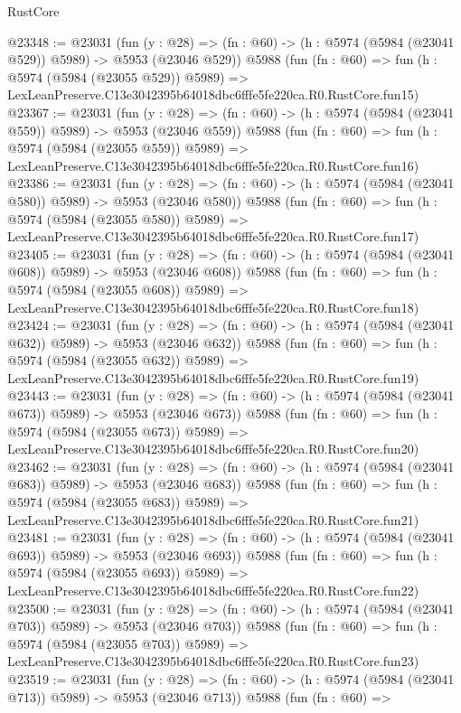 \begin{lexlean}{RustCore}
\begin{coremodule}
@23348 := @23031
    (fun (y : @28) => (fn : @60) -> (h : @5974 (@5984 (@23041 @529)) @5989) -> @5953 (@23046 @529))
    @5988
    (fun (fn : @60) =>
    fun (h : @5974 (@5984 (@23055 @529)) @5989) =>
    LexLeanPreserve.C13e3042395b64018dbc6fffe5fe220ca.R0.RustCore.fun15)
@23367 := @23031
    (fun (y : @28) => (fn : @60) -> (h : @5974 (@5984 (@23041 @559)) @5989) -> @5953 (@23046 @559))
    @5988
    (fun (fn : @60) =>
    fun (h : @5974 (@5984 (@23055 @559)) @5989) =>
    LexLeanPreserve.C13e3042395b64018dbc6fffe5fe220ca.R0.RustCore.fun16)
@23386 := @23031
    (fun (y : @28) => (fn : @60) -> (h : @5974 (@5984 (@23041 @580)) @5989) -> @5953 (@23046 @580))
    @5988
    (fun (fn : @60) =>
    fun (h : @5974 (@5984 (@23055 @580)) @5989) =>
    LexLeanPreserve.C13e3042395b64018dbc6fffe5fe220ca.R0.RustCore.fun17)
@23405 := @23031
    (fun (y : @28) => (fn : @60) -> (h : @5974 (@5984 (@23041 @608)) @5989) -> @5953 (@23046 @608))
    @5988
    (fun (fn : @60) =>
    fun (h : @5974 (@5984 (@23055 @608)) @5989) =>
    LexLeanPreserve.C13e3042395b64018dbc6fffe5fe220ca.R0.RustCore.fun18)
@23424 := @23031
    (fun (y : @28) => (fn : @60) -> (h : @5974 (@5984 (@23041 @632)) @5989) -> @5953 (@23046 @632))
    @5988
    (fun (fn : @60) =>
    fun (h : @5974 (@5984 (@23055 @632)) @5989) =>
    LexLeanPreserve.C13e3042395b64018dbc6fffe5fe220ca.R0.RustCore.fun19)
@23443 := @23031
    (fun (y : @28) => (fn : @60) -> (h : @5974 (@5984 (@23041 @673)) @5989) -> @5953 (@23046 @673))
    @5988
    (fun (fn : @60) =>
    fun (h : @5974 (@5984 (@23055 @673)) @5989) =>
    LexLeanPreserve.C13e3042395b64018dbc6fffe5fe220ca.R0.RustCore.fun20)
@23462 := @23031
    (fun (y : @28) => (fn : @60) -> (h : @5974 (@5984 (@23041 @683)) @5989) -> @5953 (@23046 @683))
    @5988
    (fun (fn : @60) =>
    fun (h : @5974 (@5984 (@23055 @683)) @5989) =>
    LexLeanPreserve.C13e3042395b64018dbc6fffe5fe220ca.R0.RustCore.fun21)
@23481 := @23031
    (fun (y : @28) => (fn : @60) -> (h : @5974 (@5984 (@23041 @693)) @5989) -> @5953 (@23046 @693))
    @5988
    (fun (fn : @60) =>
    fun (h : @5974 (@5984 (@23055 @693)) @5989) =>
    LexLeanPreserve.C13e3042395b64018dbc6fffe5fe220ca.R0.RustCore.fun22)
@23500 := @23031
    (fun (y : @28) => (fn : @60) -> (h : @5974 (@5984 (@23041 @703)) @5989) -> @5953 (@23046 @703))
    @5988
    (fun (fn : @60) =>
    fun (h : @5974 (@5984 (@23055 @703)) @5989) =>
    LexLeanPreserve.C13e3042395b64018dbc6fffe5fe220ca.R0.RustCore.fun23)
@23519 := @23031
    (fun (y : @28) => (fn : @60) -> (h : @5974 (@5984 (@23041 @713)) @5989) -> @5953 (@23046 @713))
    @5988
    (fun (fn : @60) =>

\end{coremodule}
\end{lexlean}
